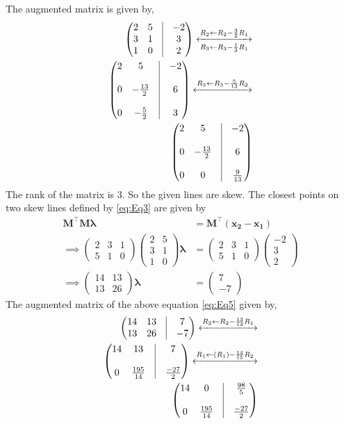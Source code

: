 \documentclass[12pt]{article}
\providecommand{\brak}[1]{\ensuremath{\left(#1\right)}}
\newcommand{\myvec}[1]{\ensuremath{\begin{pmatrix}#1\end{pmatrix}}}
\let\vec\mathbf
\begin{document}
\begin{enumerate}
The augmented matrix is given by,
\begin{align}
	\myvec{2&5&\vrule&-2\\3&1&\vrule&3\\1&0&\vrule&2}
	\xleftrightarrow[R_3 \leftarrow R_3 - \frac{1}{2}R_1]{R_2 \leftarrow R_2 - \frac{3}{2}R_1}\\
	\myvec{2&5&\vrule&-2\\&&\vrule\\0&-\frac{13}{2}&\vrule&6\\&&\vrule\\0&-\frac{5}{2}&\vrule&3}
	\xleftrightarrow{R_3 \leftarrow R_3 - \frac{5}{13}R_2}\\
	\myvec{2&5&\vrule&-2\\&&\vrule\\0&-\frac{13}{2}&\vrule&6\\&&\vrule\\0&0&\vrule&\frac{9}{13}}
\end{align}
The rank of the matrix is 3. So the given lines are skew.
The closest points on two skew lines defined by \eqref{eq:Eq3} are given by 
\begin{align}
	\vec{M}^\top \vec{M}\bm{\lambda} &= \vec{M}^\top\brak{\vec{x_2}-\vec{x_1}}\\
	\implies \myvec{2&3&1\\5&1&0}\myvec{2&5\\3&1\\1&0}\bm\lambda &= \myvec{2&3&1\\5&1&0} \myvec{-2\\3\\2} \\
	\label{eq:Eq5}
	\implies \myvec{14&13\\13&26}\bm{\lambda} &= \myvec{7\\-7}
\end{align}
The augmented matrix of the above equation \eqref{eq:Eq5} given by,
\begin{align}
	\myvec{14&13&\vrule&7\\13&26&\vrule&-7}
	\xleftrightarrow{R_2 \leftarrow R_2 - \frac{13}{14}R_1} \\
	\myvec{14&13&\vrule&7 \\&& \vrule\\ 0&\frac{195}{14}&\vrule&\frac{-27}{2}}
	\xleftrightarrow{R_1 \leftarrow \brak{R_1}-\frac{14}{15}R_2} \\
	\myvec{14&0&\vrule&\frac{98}{5}\\&&\vrule\\0&\frac{195}{14}&\vrule&\frac{-27}{2}} 

\end{align}
\end{enumerate}
\end{document}
